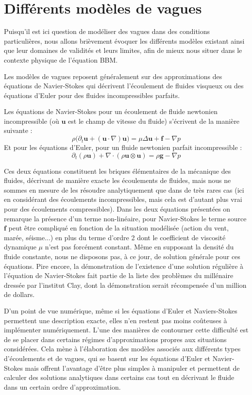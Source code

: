 \section{Différents modèles de vagues}

Puisqu'il est ici question de modéliser des vagues dans des conditions particulières, nous allons brièvement évoquer les différents modèles existant ainsi que leur domaines de validités et leurs limites, afin de mieux nous situer dans le contexte physique de l'équation BBM.

\vspace{1em}

Les modèles de vagues reposent généralement sur des approximations des équations de Navier-Stokes qui décrivent l'écoulement de fluides visqueux ou des équations d'Euler pour des fluides incompressibles parfaits. 

Les équations de Navier-Stokes pour un écoulement de fluide newtonien incompressible (où $\textbf{u}$ est le champ de vitesse du fluide) s'écrivent de la manière suivante :
$$\rho \Big(\partial_t \textbf{u} + (\textbf{u}\cdot\nabla)\textbf{u} \Big) = \mu \Delta \textbf{u} + \textbf{f} - \nabla p $$
Et pour les équations d'Euler, pour un fluide  newtonien parfait incompressible :
$$\partial_t(\rho \textbf{u}) + \nabla \cdot ( \rho \textbf{u}\otimes\textbf{u}) = \rho\textbf{g} - \nabla p$$

Ces deux équations constituent les briques élémentaires de la mécanique des fluides, décrivant de manière exacte les écoulements de fluides, mais nous ne sommes en mesure de les résoudre analytiquement que dans de très rares cas (ici en considérant des écoulements incompressibles, mais cela est d'autant plus vrai pour des écoulements compressibles). Dans les deux équations présentées on remarque la présence d'un terme non-linéaire, pour Navier-Stokes le terme source $\textbf{f}$ peut être compliqué en fonction de la situation modélisée (action du vent, marée, séisme...) en plus du terme d'ordre 2 dont le coefficient de viscosité dynamique $\mu$ n'est pas forcément constant. Même en supposant la densité du fluide constante, nous ne disposons pas, à ce jour, de solution générale pour ces équations. Pire encore, la démonstration de l'existence d'une solution régulière à l'équation de Navier-Stokes fait partie de la liste des problèmes du millénaire dressée par l'institut Clay, dont la démonstration serait récompensée d'un million de dollars.

D'un point de vue numérique, même si les équations d'Euler et Naviers-Stokes permettent une description exacte, elles n'en restent pas moins coûteuses à implémenter numériquement. L'une des manières de contourner cette difficulté est de se placer dans certains régimes d'approximations propres aux situations considérées. Cela mène à l'élaboration des modèles associés aux différents types d'écoulements et de vagues, qui se basent sur les équations d'Euler et Navier-Stokes mais offrent l'avantage d'être plus simples à manipuler et permettent de calculer des solutions analytiques dans certains cas tout en décrivant le fluide dans un certain ordre d'approximation. 

